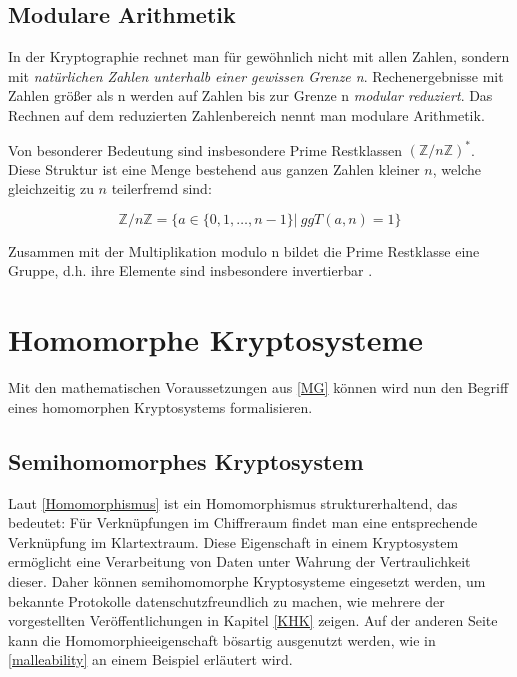 \subsection{Modulare Arithmetik}
\label{modulareArithmetik}

In der Kryptographie rechnet man für gewöhnlich nicht mit allen Zahlen, sondern mit \textit{natürlichen Zahlen unterhalb einer gewissen Grenze n}. Rechenergebnisse mit Zahlen größer als n werden auf Zahlen bis zur Grenze n \textit{modular reduziert}. Das Rechnen auf dem reduzierten Zahlenbereich nennt man modulare Arithmetik.

Von besonderer Bedeutung sind insbesondere Prime Restklassen $(\mathbb{Z}/ n\mathbb{Z})^*$. Diese Struktur ist eine Menge bestehend aus ganzen Zahlen kleiner $n$, welche gleichzeitig zu $n$ teilerfremd sind:

\begin{equation*}
	\mathbb{Z}/ n\mathbb{Z} = \big\{a\in\{0,1,\ldots,n-1\}|\ ggT(a,n)=1\big\}
\end{equation*}

Zusammen mit der Multiplikation modulo n bildet die Prime Restklasse eine Gruppe, d.h. ihre Elemente sind insbesondere invertierbar \cite[p.116]{beutelspacher1995moderne}.

\section{Homomorphe Kryptosysteme}
\label{HomoKrypto}

Mit den mathematischen Voraussetzungen aus \ref{MG} können wird nun den Begriff eines homomorphen Kryptosystems formalisieren.

\subsection{Semihomomorphes Kryptosystem}

 Laut \ref{Homomorphismus} ist ein Homomorphismus strukturerhaltend, das bedeutet: Für Verknüpfungen im Chiffreraum findet man eine entsprechende Verknüpfung im Klartextraum. Diese Eigenschaft in einem Kryptosystem ermöglicht eine Verarbeitung von Daten unter Wahrung der Vertraulichkeit dieser. Daher können semihomomorphe Kryptosysteme eingesetzt werden, um bekannte Protokolle datenschutzfreundlich zu machen, wie mehrere der vorgestellten Veröffentlichungen in Kapitel \ref{KHK} zeigen. Auf der anderen Seite kann die Homomorphieeigenschaft bösartig ausgenutzt werden, wie in \ref{malleability} an einem Beispiel erläutert wird.

